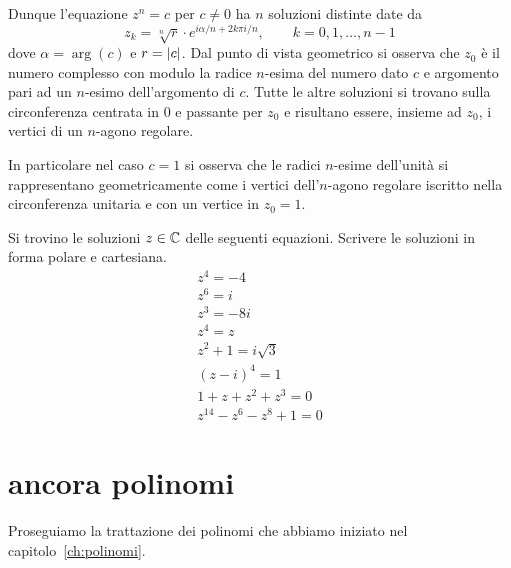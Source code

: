 Dunque l'equazione $z^n = c$ per $c\neq 0$ ha $n$ soluzioni distinte date
da
\[
z_k = \sqrt[n]{r} \cdot e^{i\alpha/n + 2k\pi i /n},
\qquad k=0,1, \dots, n-1
\]
dove $\alpha = \arg(c)$ e $r = {\left|c\right|}$.
Dal punto di vista geometrico si osserva che
$z_0$ è il numero complesso con modulo la radice $n$-esima del numero
dato $c$ e argomento pari ad un $n$-esimo dell'argomento di $c$.
Tutte le altre soluzioni si trovano sulla circonferenza centrata in $0$
e passante per $z_0$ e risultano essere, insieme ad $z_0$, i vertici
di un $n$-agono regolare.

In particolare nel caso $c=1$ si osserva che le radici $n$-esime dell'unità
si rappresentano geometricamente come i vertici dell'$n$-agono regolare iscritto
nella circonferenza unitaria e con un vertice in $z_0=1$.

\begin{exercise}
Si trovino le soluzioni $z \in {\mathbb C}$ delle seguenti equazioni.
Scrivere le soluzioni in forma polare e cartesiana.
\begin{gather*}
   z^4 = -4 \\
   z^6 = i\\
   z^3 = -8i \\
   z^4 = z\\
   z^2 + 1 = i\sqrt{3} \\
   (z-i)^4 = 1\\
   1 + z + z^2 + z^3 = 0\\
   z^{14} - z^6 - z^8 + 1 = 0
\end{gather*}
\end{exercise}

\section{ancora polinomi}
\label{ch:ancora_polinomi}
Proseguiamo la trattazione dei polinomi 
che abbiamo iniziato nel capitolo~\ref{ch:polinomi}.


